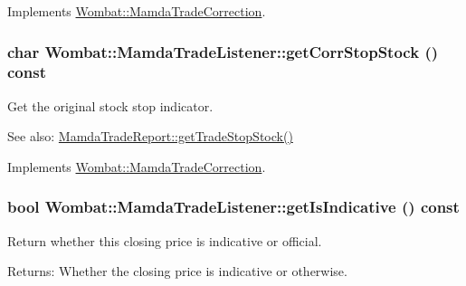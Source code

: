 Implements \hyperlink{classWombat_1_1MamdaTradeCorrection_95b91482ecf2a00c648446a8504f0fbf}{Wombat::Mamda\-Trade\-Correction}.\hypertarget{classWombat_1_1MamdaTradeListener_620da60bcf2ae217b3964f677a342c88}{
\subsubsection[getCorrStopStock]{\setlength{\rightskip}{0pt plus 5cm}char Wombat::Mamda\-Trade\-Listener::get\-Corr\-Stop\-Stock () const}}
\label{classWombat_1_1MamdaTradeListener_620da60bcf2ae217b3964f677a342c88}


Get the original stock stop indicator. 

\begin{Desc}
\item[See also:]\hyperlink{classWombat_1_1MamdaTradeReport_5e97df5f0d331db50a07db5ebf9336da}{Mamda\-Trade\-Report::get\-Trade\-Stop\-Stock()} \end{Desc}


Implements \hyperlink{classWombat_1_1MamdaTradeCorrection_ab10389dc4e9d523491374ac67e4024a}{Wombat::Mamda\-Trade\-Correction}.\hypertarget{classWombat_1_1MamdaTradeListener_4fdf4fec41a6f66b7acd2be40a7c4e03}{
\subsubsection[getIsIndicative]{\setlength{\rightskip}{0pt plus 5cm}bool Wombat::Mamda\-Trade\-Listener::get\-Is\-Indicative () const}}
\label{classWombat_1_1MamdaTradeListener_4fdf4fec41a6f66b7acd2be40a7c4e03}


Return whether this closing price is indicative or official. 

\begin{Desc}
\item[Returns:]Whether the closing price is indicative or otherwise. \end{Desc}


